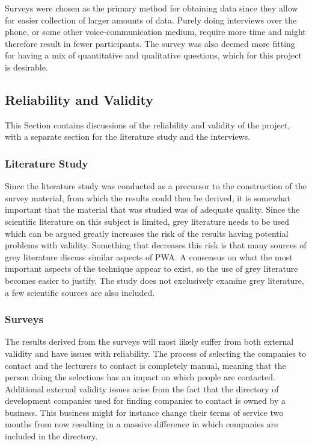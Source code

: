 \documentclass[a4paper,12pt]{article}
\begin{document}
Surveys were chosen as the primary method for obtaining data since they allow for easier collection of larger amounts of data. Purely doing interviews over the phone, or some other voice-communication medium, require more time and might therefore result in fewer participants. The survey was also deemed more fitting for having a mix of quantitative and qualitative questions, which for this project is desirable.

\subsection{Reliability and Validity}
\label{Method_reliabilityValidity}
This Section contains discussions of the reliability and validity of the project, with a separate section for the literature study and the interviews.

\subsubsection{Literature Study}
\label{Method_reliabilityValidity_study}
Since the literature study was conducted as a precursor to the construction of the survey material, from which the results could then be derived, it is somewhat important that the material that was studied was of adequate quality. Since the scientific literature on this subject is limited, grey literature needs to be used which can be argued greatly increases the risk of the results having potential problems with validity. Something that decreases this risk is that many sources of grey literature discuss similar aspects of PWA. A consensus on what the most important aspects of the technique appear to exist, so the use of grey literature becomes easier to justify. The study does not exclusively examine grey literature, a few scientific sources are also included.

\subsubsection{Surveys}
\label{Method_reliabilityValidity_surveys}
The results derived from the surveys will most likely suffer from both external validity and have issues with reliability. The process of selecting the companies to contact and the lecturers to contact is completely manual, meaning that the person doing the selections has an impact on which people are contacted. Additional external validity issues arise from the fact that the directory of development companies used for finding companies to contact is owned by a business. This business might for instance change their terms of service two months from now resulting in a massive difference in which companies are included in the directory.
\end{document}
